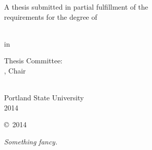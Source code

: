 \begin{SingleSpace}
\begin{center}
  A thesis submitted in partial fulfillment of the\\
  requirements for the degree of
\end{center}

\vfill

\begin{center}
  \thesisDegree\\
  in\\
  \thesisDept
\end{center}

\vfill

\begin{center}
  Thesis Committee:\\
  \thesisAdvisor, Chair\\
  \thesisCommitteeOne\\
  \thesisCommitteeTwo
\end{center}

\vfill

\begin{center}
    Portland State University\\
    2014
\end{center}
\end{SingleSpace}

\cleardoublepage  %
\thispagestyle{empty}

\begin{center}
    \vspace*{2.5 in}
    \copyright~2014 \thesisAuthor
\end{center}

\cleardoublepage



\clearpage

\vspace*{\fill}
{\hfill\sffamily\itshape Something fancy.}  %


\rmfamily
\normalfont



\clearpage
 

\begin{Spacing}{1.3}
\tableofcontents*  %



\clearpage
\listoftables

\clearpage
\listoffigures
\end{Spacing}


